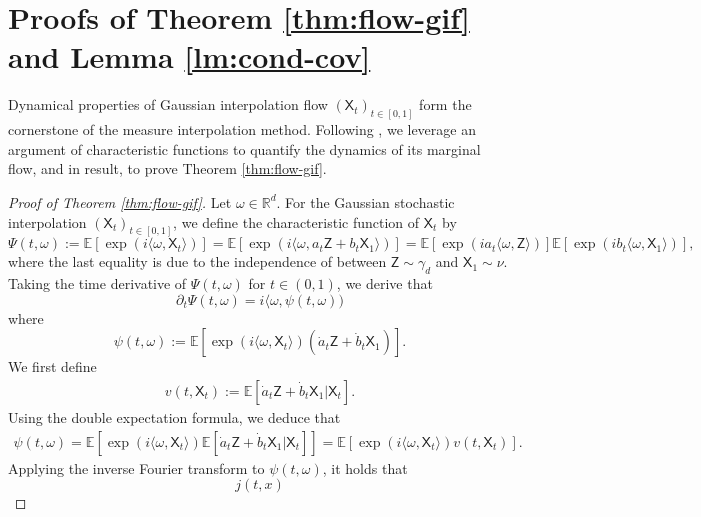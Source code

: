 \documentclass[twoside,11pt]{article}
\def\sR{{\mathbb{R}}}
\newcommand{\E}{\mathbb{E}}
\numberwithin{equation}{section}
\begin{document}
\section{Proofs of Theorem \ref{thm:flow-gif} and Lemma \ref{lm:cond-cov}}
Dynamical properties of Gaussian interpolation flow $(\mathsf{X}_t)_{t \in [0, 1]}$ form the cornerstone of the measure interpolation method. Following \citet{albergo2023building, albergo2023stochastic}, we leverage an argument of characteristic functions to quantify the dynamics of its marginal flow, and in result, to prove Theorem \ref{thm:flow-gif}.
\begin{proof} [Proof of Theorem \ref{thm:flow-gif}]
Let $\omega \in \sR^d$.
For the Gaussian stochastic interpolation $(\mathsf{X}_t)_{t \in [0, 1]}$, we define the characteristic function of $\mathsf{X}_t$ by
\begin{equation*}
    \Psi(t, \omega)
    := \E [\exp(i \langle \omega, \mathsf{X}_t \rangle)]
    = \E [\exp(i \langle \omega, a_t \mathsf{Z} + b_t \mathsf{X}_1 \rangle)]
    = \E [\exp(i a_t \langle \omega, \mathsf{Z} \rangle)] \E [\exp(i b_t \langle \omega, \mathsf{X}_1 \rangle)],
\end{equation*}
where the last equality is due to the independence of between $\mathsf{Z} \sim \gamma_d$ and $\mathsf{X}_1 \sim \nu$.
Taking the time derivative of $\Psi(t, \omega)$ for $t \in (0, 1)$, we derive that
\begin{equation*}
    \partial_t \Psi(t, \omega) = i \langle \omega, \psi(t, \omega))
\end{equation*}
where
\begin{equation*}
    \psi(t, \omega) := \E [\exp(i \langle \omega, \mathsf{X}_t \rangle) (\dot{a}_t \mathsf{Z} + \dot{b}_t \mathsf{X}_1)].
\end{equation*}
We first define
\begin{align} \label{eq:def-vf}
    v(t, \mathsf{X}_t) := \E[ \dot{a}_t \mathsf{Z} + \dot{b}_t \mathsf{X}_1 | \mathsf{X}_t].
\end{align}
Using the double expectation formula, we deduce that
\begin{align*}
    \psi(t, \omega)
    = \E[ \exp(i \langle \omega, \mathsf{X}_t \rangle) \E[\dot{a}_t \mathsf{Z} + \dot{b}_t \mathsf{X}_1 | \mathsf{X}_t] ]
    = \E[ \exp(i \langle \omega, \mathsf{X}_t \rangle) v(t, \mathsf{X}_t) ].
\end{align*}
Applying the inverse Fourier transform to $\psi(t, \omega)$, it holds that
\begin{equation*}
    j(t, x)

\end{equation*}
\end{proof}
\end{document}
